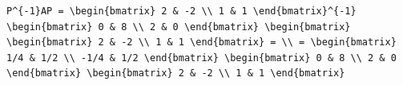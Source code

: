 \documentclass[
  ukrainian,
]{article}
\begin{document}
\begin{verbatim}
P^{-1}AP = \begin{bmatrix} 2 & -2 \\ 1 & 1 \end{bmatrix}^{-1} \begin{bmatrix} 0 & 8 \\ 2 & 0 \end{bmatrix} \begin{bmatrix} \begin{bmatrix} 2 & -2 \\ 1 & 1 \end{bmatrix} = \\ = \begin{bmatrix} 1/4 & 1/2 \\ -1/4 & 1/2 \end{bmatrix} \begin{bmatrix} 0 & 8 \\ 2 & 0 \end{bmatrix} \begin{bmatrix} 2 & -2 \\ 1 & 1 \end{bmatrix}
\end{verbatim}
\end{document}
